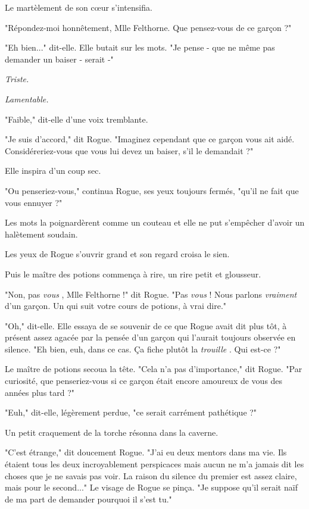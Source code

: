 Le martèlement de son cœur s'intensifia.

"Répondez-moi honnêtement, Mlle Felthorne. Que pensez-vous de ce garçon ?"

"Eh bien..." dit-elle. Elle butait sur les mots. "Je pense - que ne même pas demander un baiser - serait -"

\emph{Triste.} 

\emph{Lamentable.} 

"Faible," dit-elle d'une voix tremblante.

"Je suis d'accord," dit Rogue. "Imaginez cependant que ce garçon vous ait aidé. Considéreriez-vous que vous lui devez un baiser, s'il le demandait ?"

Elle inspira d'un coup sec.

"Ou penseriez-vous," continua Rogue, ses yeux toujours fermés, "qu'il ne fait que vous ennuyer ?"

Les mots la poignardèrent comme un couteau et elle ne put s'empêcher d'avoir un halètement soudain.

Les yeux de Rogue s'ouvrir grand et son regard croisa le sien.

Puis le maître des potions commença à rire, un rire petit et glousseur.

"Non, pas \emph{vous} , Mlle Felthorne !" dit Rogue. "Pas \emph{vous}  ! Nous parlons \emph{vraiment}  d'un garçon. Un qui suit votre cours de potions, à vrai dire."

"Oh," dit-elle. Elle essaya de se souvenir de ce que Rogue avait dit plus tôt, à présent assez agacée par la pensée d'un garçon qui l'aurait toujours observée en silence. "Eh bien, euh, dans ce cas. Ça fiche plutôt la \emph{trouille} . Qui est-ce ?"

Le maître de potions secoua la tête. "Cela n'a pas d'importance," dit Rogue. "Par curiosité, que penseriez-vous si ce garçon était encore amoureux de vous des années plus tard ?"

"Euh," dit-elle, légèrement perdue, "ce serait carrément pathétique ?"

Un petit craquement de la torche résonna dans la caverne.

"C'est étrange," dit doucement Rogue. "J'ai eu deux mentors dans ma vie. Ils étaient tous les deux incroyablement perspicaces mais aucun ne m'a jamais dit les choses que je ne savais pas voir. La raison du silence du premier est assez claire, mais pour le second..." Le visage de Rogue se pinça. "Je suppose qu'il serait naïf de ma part de demander pourquoi il s'est tu."

